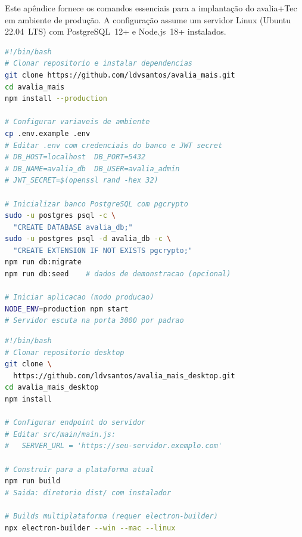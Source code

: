 \documentclass[preprint,12pt,a4paper]{elsarticle}
\begin{document}
Este apêndice fornece os comandos essenciais para a implantação do avalia+Tec em ambiente de produção. A configuração assume um servidor Linux (Ubuntu 22.04~LTS) com PostgreSQL~12+ e Node.js~18+ instalados.

\begin{lstlisting}[language=sh, caption={Implantação do backend e portal web do avalia+Tec no servidor. O script clona o repositório, instala dependências, configura o banco de dados e inicia a aplicação.}, label=lst:deploy]
#!/bin/bash
# Clonar repositorio e instalar dependencias
git clone https://github.com/ldvsantos/avalia_mais.git
cd avalia_mais
npm install --production

# Configurar variaveis de ambiente
cp .env.example .env
# Editar .env com credenciais do banco e JWT secret
# DB_HOST=localhost  DB_PORT=5432
# DB_NAME=avalia_db  DB_USER=avalia_admin
# JWT_SECRET=$(openssl rand -hex 32)

# Inicializar banco PostgreSQL com pgcrypto
sudo -u postgres psql -c \
  "CREATE DATABASE avalia_db;"
sudo -u postgres psql -d avalia_db -c \
  "CREATE EXTENSION IF NOT EXISTS pgcrypto;"
npm run db:migrate
npm run db:seed    # dados de demonstracao (opcional)

# Iniciar aplicacao (modo producao)
NODE_ENV=production npm start
# Servidor escuta na porta 3000 por padrao
\end{lstlisting}

\begin{lstlisting}[language=sh, caption={Construção do aplicativo desktop Electron para avaliadores. Produz instaladores específicos por plataforma para Windows, macOS e Linux.}, label=lst:desktopbuild]
#!/bin/bash
# Clonar repositorio desktop
git clone \
  https://github.com/ldvsantos/avalia_mais_desktop.git
cd avalia_mais_desktop
npm install

# Configurar endpoint do servidor
# Editar src/main/main.js:
#   SERVER_URL = 'https://seu-servidor.exemplo.com'

# Construir para a plataforma atual
npm run build
# Saida: diretorio dist/ com instalador

# Builds multiplataforma (requer electron-builder)
npx electron-builder --win --mac --linux
\end{lstlisting}



\end{document}
